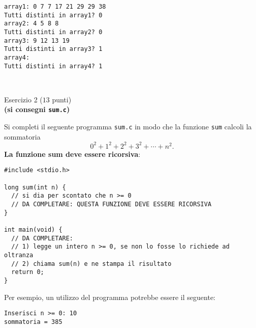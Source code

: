 \documentclass[12pt]{article}
\begin{document}
\begin{mdframed}[backgroundcolor=lightgrey] 
\begin{verbatim}
array1: 0 7 7 17 21 29 29 38 
Tutti distinti in array1? 0
array2: 4 5 8 8 
Tutti distinti in array2? 0
array3: 9 12 13 19 
Tutti distinti in array3? 1
array4: 
Tutti distinti in array4? 1
\end{verbatim}
\end{mdframed}

\mbox{}\\
\begin{center}{\Large Esercizio 2} ($13$ punti)\\
  \textbf{(si consegni \texttt{sum.c})}\end{center}
%
Si completi il seguente programma \texttt{sum.c} in modo che la funzione
\texttt{sum} calcoli la sommatoria
\[
 0^2 + 1^2 + 2^2 + 3^2 + \cdots + n^2.
\]
\textbf{La funzione sum deve essere ricorsiva}:

\begin{center}
  \begin{lstlisting}[language=myC]
#include <stdio.h>

long sum(int n) {
  // si dia per scontato che n >= 0
  // DA COMPLETARE: QUESTA FUNZIONE DEVE ESSERE RICORSIVA
}

int main(void) {
  // DA COMPLETARE:
  // 1) legge un intero n >= 0, se non lo fosse lo richiede ad oltranza
  // 2) chiama sum(n) e ne stampa il risultato
  return 0;
}

  \end{lstlisting}
\end{center}

Per esempio, un utilizzo del programma potrebbe essere il seguente:

\begin{mdframed}[backgroundcolor=lightgrey] 
\begin{verbatim}
Inserisci n >= 0: 10
sommatoria = 385
\end{verbatim}
\end{mdframed}
\end{document}
